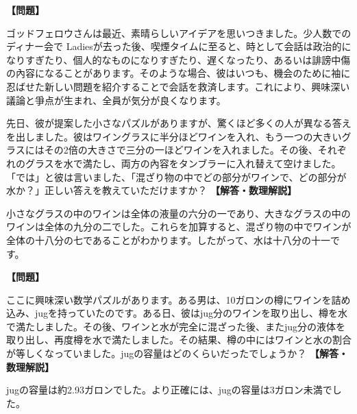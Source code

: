 \documentclass[10pt,a4paper,oneside,openany]{ltjsbook}
\begin{document}
\begin{tcolorbox}[colback=softblue,colframe=primaryblue,title=\textbf{第 367 問：ワインと水 （原題: WINE AND WATER.）},arc=2mm,boxrule=1pt,breakable]
\textbf{【問題】}\par\vspace{0.3em}
ゴッドフェロウさんは最近、素晴らしいアイデアを思いつきました。少人数でのディナー会で Ladiesが去った後、喫煙タイムに至ると、時として会話は政治的になりすぎたり、個人的なものになりすぎたり、遅くなったり、あるいは誹謗中傷の內容になることがあります。そのような場合、彼はいつも、機会のために袖に忍ばせた新しい問題を紹介することで会話を救済します。これにより、興味深い議論と爭点が生まれ、全員が気分が良くなります。

先日、彼が提案した小さなパズルがありますが、驚くほど多くの人が異なる答えを出しました。彼はワイングラスに半分ほどワインを入れ、もう一つの大きいグラスにはその2倍の大きさで三分の一ほどワインを入れました。その後、それぞれのグラスを水で満たし、両方の內容をタンブラーに入れ替えて空けました。「では」と彼は言いました、「混ざり物の中でどの部分がワインで、どの部分が水か？」正しい答えを教えていただけますか？
\tcblower
\textbf{【解答・数理解説】}\par\vspace{0.3em}
小さなグラスの中のワインは全体の液量の六分の一であり、大きなグラスの中のワインは全体の九分の二でした。これらを加算すると、混ざり物の中でワインが全体の十八分の七であることがわかります。したがって、水は十八分の十一です。
\end{tcolorbox}

\begin{tcolorbox}[colback=softblue,colframe=primaryblue,title=\textbf{第 368 問：樽の中のワイン （原題: THE KEG OF WINE.）},arc=2mm,boxrule=1pt,breakable]
\textbf{【問題】}\par\vspace{0.3em}
ここに興味深い数学パズルがあります。ある男は、10ガロンの樽にワインを詰め込み、jugを持っていたのです。ある日、彼はjug分のワインを取り出し、樽を水で満たしました。その後、ワインと水が完全に混ざった後、またjug分の液体を取り出し、再度樽を水で満たしました。その結果、樽の中にはワインと水の割合が等しくなっていました。jugの容量はどのくらいだったでしょうか？
\tcblower
\textbf{【解答・数理解説】}\par\vspace{0.3em}
jugの容量は約2.93ガロンでした。より正確には、jugの容量は3ガロン未満でした。
\end{tcolorbox}
\end{document}
